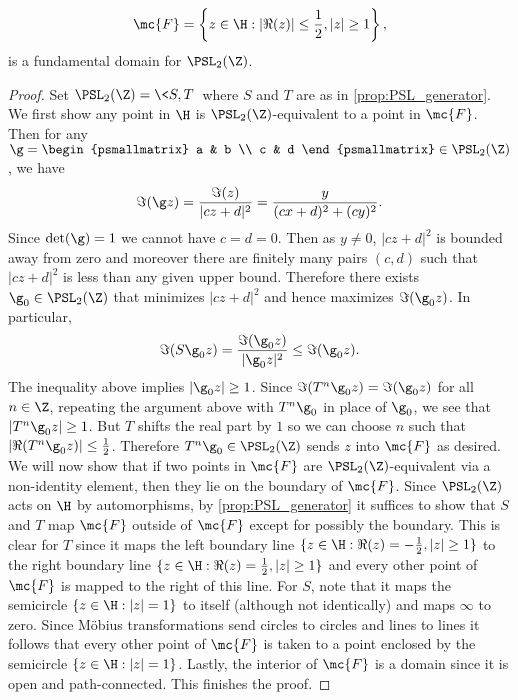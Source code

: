       \begin{proposition}\label{prop:fundamental_domain_modular_group}
        \[
          \mc{F} = \left\{z \in \H:|\Re(z)| \le \frac{1}{2}, |z| \ge 1\right\},
        \]
        is a fundamental domain for $\PSL_{2}(\Z)$.
      \end{proposition}
      \begin{proof}
        Set $\PSL_{2}(\Z) = \<S,T\>$ where $S$ and $T$ are as in \cref{prop:PSL_generator}. We first show any point in $\H$ is $\PSL_{2}(\Z)$-equivalent to a point in $\mc{F}$. Then for any $\g = \begin{psmallmatrix} a & b \\ c & d \end{psmallmatrix} \in \PSL_{2}(\Z)$, we have
        \[
          \Im(\g z) = \frac{\Im(z)}{|cz+d|^{2}} = \frac{y}{(cx+d)^{2}+(cy)^{2}}.
        \]
        Since $\det(\g) = 1$ we cannot have $c = d = 0$. Then as $y \neq 0$, $|cz+d|^{2}$ is bounded away from zero and moreover there are finitely many pairs $(c,d)$ such that $|cz+d|^{2}$ is less than any given upper bound. Therefore there exists $\g_{0} \in \PSL_{2}(\Z)$ that minimizes $|cz+d|^{2}$ and hence maximizes $\Im(\g_{0}z)$. In particular,
        \[
          \Im(S\g_{0}z) = \frac{\Im(\g_{0}z)}{|\g_{0}z|^{2}} \le \Im(\g_{0}z).
        \]
        The inequality above implies $|\g_{0}z| \ge 1$. Since $\Im(T^{n}\g_{0}z) = \Im(\g_{0}z)$ for all $n \in \Z$, repeating the argument above with $T^{n}\g_{0}$ in place of $\g_{0}$, we see that $|T^{n}\g_{0}z| \ge 1$. But $T$ shifts the real part by $1$ so we can choose $n$ such that $|\Re(T^{n}\g_{0}z)| \le \frac{1}{2}$. Therefore $T^{n}\g_{0} \in \PSL_{2}(\Z)$ sends $z$ into $\mc{F}$ as desired. We will now show that if two points in $\mc{F}$ are $\PSL_{2}(\Z)$-equivalent via a non-identity element, then they lie on the boundary of $\mc{F}$. Since $\PSL_{2}(\Z)$ acts on $\H$ by automorphisms, by \cref{prop:PSL_generator} it suffices to show that $S$ and $T$ map $\mc{F}$ outside of $\mc{F}$ except for possibly the boundary. This is clear for $T$ since it maps the left boundary line $\{z \in \H:\Re(z) = -\frac{1}{2},|z| \ge 1\}$ to the right boundary line $\{z \in \H:\Re(z) = \frac{1}{2},|z| \ge 1\}$ and every other point of $\mc{F}$ is mapped to the right of this line. For $S$, note that it maps the semicircle $\{z \in \H:|z| = 1\}$ to itself (although not identically) and maps $\infty$ to zero. Since M\"obius transformations send circles to circles and lines to lines it follows that every other point of $\mc{F}$ is taken to a point enclosed by the semicircle $\{z \in \H:|z| = 1\}$. Lastly, the interior of $\mc{F}$ is a domain since it is open and path-connected. This finishes the proof.
      \end{proof}

